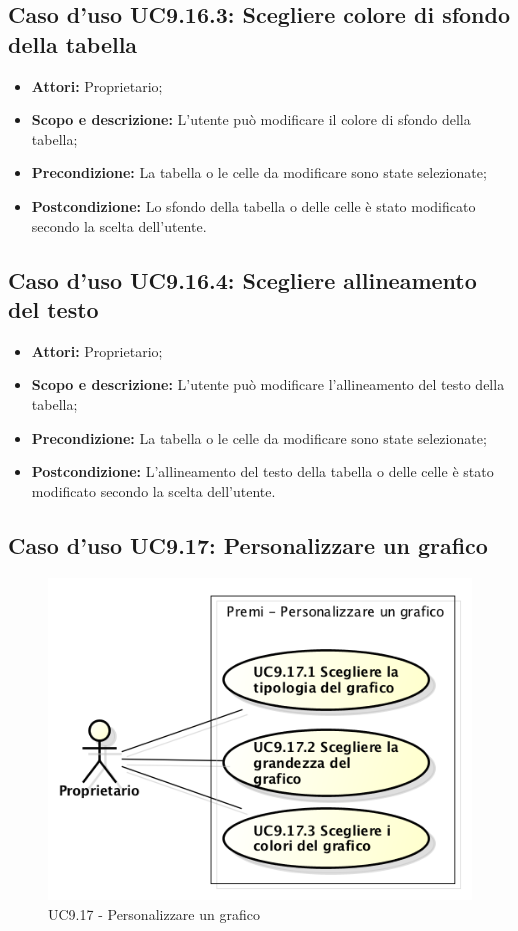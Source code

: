 \subsection{Caso d'uso UC9.16.3: Scegliere colore di sfondo della tabella}
\begin{itemize}
	\item \textbf{Attori:} Proprietario;
	\item \textbf{Scopo e descrizione:} L'utente può modificare il colore di sfondo della tabella;
	\item \textbf{Precondizione:} La tabella o le celle da modificare sono state selezionate;
	\item \textbf{Postcondizione:} Lo sfondo della tabella o delle celle è stato modificato secondo la scelta dell'utente.
\end{itemize}

\subsection{Caso d'uso UC9.16.4: Scegliere allineamento del testo}
\begin{itemize}
	\item \textbf{Attori:} Proprietario;
	\item \textbf{Scopo e descrizione:} L'utente può modificare l'allineamento del testo della tabella;
	\item \textbf{Precondizione:} La tabella o le celle da modificare sono state selezionate;
	\item \textbf{Postcondizione:} L'allineamento del testo della tabella o delle celle è stato modificato secondo la scelta dell'utente.
\end{itemize}


\subsection{Caso d'uso UC9.17: Personalizzare un grafico}
\begin{figure}[h] 
	\centering 
	\includegraphics[scale=0.45] {img/UC9.17.png} 
	\caption{UC9.17 - Personalizzare un grafico} 
\end{figure}

